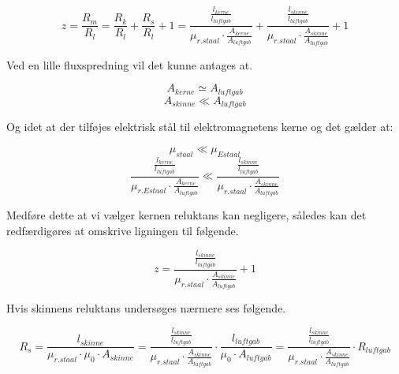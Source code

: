 \begin{equation}
z = \frac{R_m}{R_l} = \frac{R_k}{R_l} +\frac{R_s}{R_l} + 1 = \frac{
\frac{l_{kerne}}{l_{luftgab}} }
	{\mu_{r.staal} \cdot \frac{A_{kerne}}{A_{luftgab}} }
+
\frac{
	\frac{l_{skinne}}{l_{luftgab}} }
{\mu_{r.staal} \cdot \frac{A_{skinne}}{A_{luftgab}} }
+ 1
\end{equation}

Ved en lille fluxspredning vil det kunne antages at.

\begin{equation}
A_{kerne} \simeq A_{luftgab}
\end{equation}
\begin{equation}
A_{skinne} \ll A_{luftgab}
\end{equation}

Og idet at der tilføjes elektrisk stål til elektromagnetens kerne og det gælder at:

\begin{equation}
\mu_{staal} \ll \mu_{Estaal}
\end{equation}
\begin{equation}
  \frac{\frac{l_{kerne}}{l_{luftgab}}}{
  	{\mu_{r.Estaal} \cdot \frac{A_{kerne}}{A_{luftgab}} }} \ll \frac{
	\frac{l_{skinne}}{l_{luftgab}} }
{\mu_{r.staal} \cdot \frac{A_{skinne}}{A_{luftgab}} }
\end{equation}

Medføre dette at vi vælger kernen reluktans kan negligere, således kan det redfærdigøres at omskrive ligningen til følgende.

\begin{equation}
z =
\frac{
	\frac{l_{skinne}}{l_{luftgab}} }
{\mu_{r.staal} \cdot \frac{A_{skinne}}{A_{luftgab}} }
+ 1
\end{equation}

Hvis skinnens reluktans undersøges nærmere ses følgende.


\begin{equation}
R_s =  \frac{l_{skinne}}{\mu_{r.staal} \cdot \mu_0 \cdot A_{skinne} }
=
\frac{
	\frac{l_{skinne}}{l_{luftgab}} }{\mu_{r.staal} \cdot \frac{A_{skinne}}{A_{luftgab}} }\cdot \frac{l_{luftgab}}{\mu_0 \cdot A_{luftgab}}=\frac{
	\frac{l_{skinne}}{l_{luftgab}} }
	{\mu_{r.staal}\cdot\frac{A_{skinne}}{A_{luftgab}}}\cdot R_{luftgab}
\end{equation}


